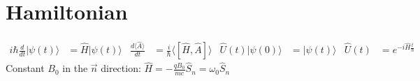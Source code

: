 \documentclass{article}
\newcommand{\mysection}[1]{\vspace{-2em}
\section*{#1}
\vspace{-2em}}
\newcommand{\ket}[1]{\ensuremath{\mid#1\rangle}}
\newcommand{\expect}[1]{\ensuremath{\langle#1\rangle}}
\newcommand{\op}[1]{\ensuremath{\hat#1}}
\begin{document}
	\mysection{Hamiltonian}
	\begin{align*}
		i\hbar\frac{d}{dt}\ket{\psi(t)}&=\op{H}\ket{\psi(t)} &
		\frac{d\expect{\op{A}}}{dt}&=\frac{i}{\hbar}\expect{[\op{H},\op{A}]} &
		\op{U(t)}\ket{\psi(0)}&=\ket{\psi(t)} &
		\op{U(t)}&=e^{-i\op{H}\frac{t}{\hbar}}
	\end{align*}
	Constant $B_0$ in the $\vec{n}$ direction: 
		$\op{H}=-\frac{qB_0}{mc}\op{S_n}=\omega_0\op{S_n}$
\end{document}
